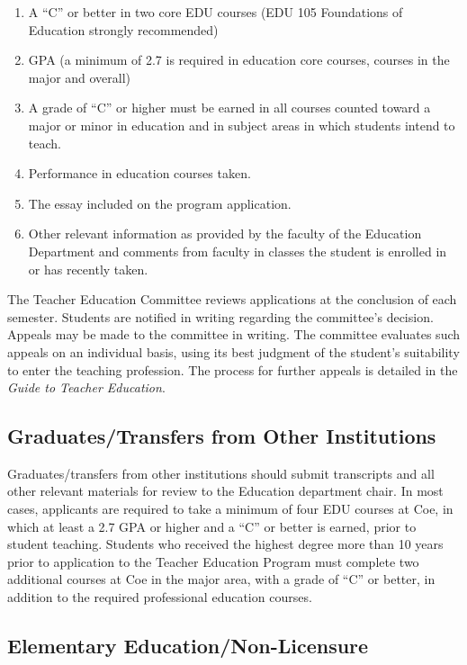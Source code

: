 \documentclass[
  letterpaper,
]{scrbook}
\providecommand{\tightlist}{%
  \setlength{\itemsep}{0pt}\setlength{\parskip}{0pt}}
\begin{document}
\begin{enumerate}
\def\labelenumi{\arabic{enumi}.}
\tightlist
\item
  A ``C'' or better in two core EDU courses (EDU 105 Foundations of
  Education strongly recommended)
\item
  GPA (a minimum of 2.7 is required in education core courses, courses
  in the major and overall)
\item
  A grade of ``C'' or higher must be earned in all courses counted
  toward a major or minor in education and in subject areas in which
  students intend to teach.
\item
  Performance in education courses taken.
\item
  The essay included on the program application.
\item
  Other relevant information as provided by the faculty of the Education
  Department and comments from faculty in classes the student is
  enrolled in or has recently taken.
\end{enumerate}

The Teacher Education Committee reviews applications at the conclusion
of each semester. Students are notified in writing regarding the
committee's decision. Appeals may be made to the committee in writing.
The committee evaluates such appeals on an individual basis, using its
best judgment of the student's suitability to enter the teaching
profession. The process for further appeals is detailed in the
\emph{Guide to Teacher Education}.

\subsection{Graduates/Transfers from Other
Institutions}\label{graduatestransfers-from-other-institutions}

Graduates/transfers from other institutions should submit transcripts
and all other relevant materials for review to the Education department
chair. In most cases, applicants are required to take a minimum of four
EDU courses at Coe, in which at least a 2.7 GPA or higher and a ``C'' or
better is earned, prior to student teaching. Students who received the
highest degree more than 10 years prior to application to the Teacher
Education Program must complete two additional courses at Coe in the
major area, with a grade of ``C'' or better, in addition to the required
professional education courses.

\subsection{Elementary
Education/Non-Licensure}\label{elementary-educationnon-licensure}
\end{document}
